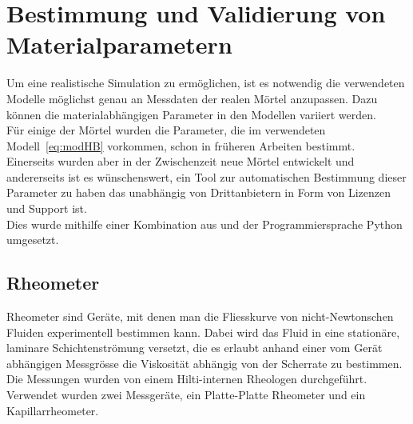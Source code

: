 \section{Bestimmung und Validierung von Materialparametern}
\label{Kapitel:Parameter}
Um eine realistische Simulation zu ermöglichen, ist es notwendig die verwendeten Modelle möglichst genau an Messdaten der realen Mörtel anzupassen. Dazu können die materialabhängigen Parameter in den Modellen variiert werden.\\
Für einige der Mörtel wurden die Parameter, die im verwendeten Modell~\eqref{eq:modHB} vorkommen, schon in früheren Arbeiten bestimmt. \\
Einerseits wurden aber in der Zwischenzeit neue Mörtel entwickelt und andererseits ist es wünschenswert, ein Tool zur automatischen Bestimmung dieser Parameter zu haben das unabhängig von Drittanbietern in Form von Lizenzen und Support ist. \\
Dies wurde mithilfe einer Kombination aus \openfoam{} und der Programmiersprache Python umgesetzt.
%
\subsection{Rheometer}
Rheometer sind Geräte, mit denen man die Fliesskurve von nicht-Newtonschen Fluiden experimentell bestimmen kann.
Dabei wird das Fluid in eine stationäre, laminare Schichtenströmung versetzt, die es erlaubt anhand einer vom Gerät abhängigen Messgrösse die Viskosität abhängig von der Scherrate zu bestimmen.
Die Messungen wurden von einem Hilti-internen Rheologen durchgeführt. Verwendet wurden zwei Messgeräte, ein Platte-Platte Rheometer und ein Kapillarrheometer.
%
